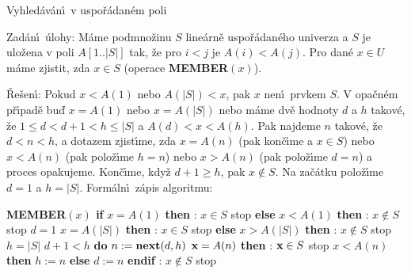 \heading
Vyhled\'av\'an\'\i\ v uspo\v r\'adan\'em poli
\endheading

\flushpar Zad\'an\'\i\ \'ulohy: M\'ame podmno\v zinu $S$ line\'arn\v e 
uspo\v r\'adan\'eho univerza a $S$ je ulo\v zena v poli 
$A[1..|S|]$ tak, \v ze pro $i<j$ je $A(i)<A(j)$. Pro dan\'e $x\in 
U$ 
m\'ame zjistit, zda $x\in S$ (operace {\bf MEMBER$(x)$}).
\medskip

\flushpar\v Re\v sen\'\i :  Pokud $x<A(1)$ nebo $A(|S|)<x$, pak $
x$ 
nen\'\i\ prvkem $S$.  V opa\v cn\'em p\v r\'\i pad\v e bu\v d $x=
A(1)$ nebo 
$x=A(|S|)$ nebo m\'ame dv\v e hodnoty $d$ 
a $h$ takov\'e, \v ze $1\le d<d+1<h\le |S|$ a $A(d)<x<A(h)$.  Pak 
najdeme $n$ takov\'e, \v ze $d<n<h$, a dotazem 
zjist\'\i me, zda $x=A(n)$ (pak kon\v c\'\i me a $x\in S$) nebo 
$x<A(n)$ (pak polo\v z\'\i me $h=n$) nebo $x>A(n)$ (pak 
polo\v z\'\i me $d=n$) a proces opakujeme.  Kon\v c\'\i me, kdy\v z 
$d+1\ge h$, pak $x\notin S$. Na za\v c\'atku polo\v z\'\i me $d=1$ a $
h=|S|$.
Form\'aln\'\i\ z\'apis algoritmu:
\bigskip

{\bf MEMBER$(x)$\newline 
if} $x=A(1)$ {\bf then}\newline 
\phantom{---}{\bf V\'ystup}: $x\in S$ stop\newline 
{\bf else}\newline 
\phantom{---}{\bf if} $x<A(1)$ {\bf then}\newline 
\phantom{------}{\bf V\'ystup}: $x\notin S$ stop\newline 
\phantom{---}{\bf else}\newline 
\phantom{------}$d=1$\newline 
\phantom{---}{\bf endif\newline
\bf endif\newline 
if} $x=A(|S|)$ {\bf then}\newline 
\phantom{---}{\bf V\'ystup}: $x\in S$ stop\newline 
{\bf else}\newline 
\phantom{---}{\bf if} $x>A(|S|)$ {\bf then}\newline 
\phantom{------}{\bf V\'ystup}: $x\notin S$ stop\newline 
\phantom{---}{\bf else}\newline 
\phantom{------}$h=|S|$\newline 
\phantom{---}{\bf endif\newline
endif\newline 
while} $d+1<h$ {\bf do}\newline 
\phantom{---}$n:=\text{{\bf next}}(d,h)$\newline 
\phantom{---}{\bf if} $\bold x=A(n)$ {\bf then}\newline 
\phantom{------}{\bf V\'ystup}: $\bold x\in S$ stop\newline 
\phantom{---}{\bf else}\newline 
\phantom{------}{\bf if} $x<A(n)$ {\bf then} $h:=n$ {\bf else} $d:=n$ {\bf endif}\newline 
\phantom{---}{\bf endif\newline 
enddo\newline 
V\'ystup}: $x\notin S$ stop
\medskip

